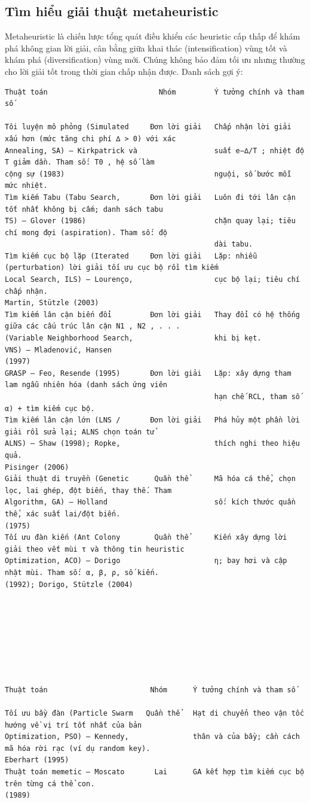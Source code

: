 \documentclass[a4paper,11pt]{article}
\begin{document}
\subsection{Tìm hiểu giải thuật metaheuristic}
Metaheuristic là chiến lược tổng quát điều khiển các heuristic cấp thấp để khám phá không gian lời giải, cân bằng giữa khai thác (intensification) vùng tốt và khám phá (diversification) vùng mới. Chúng không bảo đảm tối ưu nhưng thường cho lời giải tốt trong thời gian chấp nhận được. Danh sách gợi ý:

\begin{Verbatim}[fontsize=\tiny,breaklines=true,breakanywhere=true]
Thuật toán                          Nhóm         Ý tưởng chính và tham số

Tôi luyện mô phỏng (Simulated     Đơn lời giải   Chấp nhận lời giải xấu hơn (mức tăng chi phí ∆ > 0) với xác
Annealing, SA) – Kirkpatrick và                  suất e−∆/T ; nhiệt độ T giảm dần. Tham số: T0 , hệ số làm
cộng sự (1983)                                   nguội, số bước mỗi mức nhiệt.
Tìm kiếm Tabu (Tabu Search,       Đơn lời giải   Luôn đi tới lân cận tốt nhất không bị cấm; danh sách tabu
TS) – Glover (1986)                              chặn quay lại; tiêu chí mong đợi (aspiration). Tham số: độ
                                                 dài tabu.
Tìm kiếm cục bộ lặp (Iterated     Đơn lời giải   Lặp: nhiễu (perturbation) lời giải tối ưu cục bộ rồi tìm kiếm
Local Search, ILS) – Lourenço,                   cục bộ lại; tiêu chí chấp nhận.
Martin, Stützle (2003)
Tìm kiếm lân cận biến đổi         Đơn lời giải   Thay đổi có hệ thống giữa các cấu trúc lân cận N1 , N2 , . . .
(Variable Neighborhood Search,                   khi bị kẹt.
VNS) – Mladenović, Hansen
(1997)
GRASP – Feo, Resende (1995)       Đơn lời giải   Lặp: xây dựng tham lam ngẫu nhiên hóa (danh sách ứng viên
                                                 hạn chế RCL, tham số α) + tìm kiếm cục bộ.
Tìm kiếm lân cận lớn (LNS /       Đơn lời giải   Phá hủy một phần lời giải rồi sửa lại; ALNS chọn toán tử
ALNS) – Shaw (1998); Ropke,                      thích nghi theo hiệu quả.
Pisinger (2006)
Giải thuật di truyền (Genetic      Quần thể      Mã hóa cá thể, chọn lọc, lai ghép, đột biến, thay thế. Tham
Algorithm, GA) – Holland                         số: kích thước quần thể, xác suất lai/đột biến.
(1975)
Tối ưu đàn kiến (Ant Colony        Quần thể      Kiến xây dựng lời giải theo vết mùi τ và thông tin heuristic
Optimization, ACO) – Dorigo                      η; bay hơi và cập nhật mùi. Tham số: α, β, ρ, số kiến.
(1992); Dorigo, Stützle (2004)








Thuật toán                        Nhóm      Ý tưởng chính và tham số

Tối ưu bầy đàn (Particle Swarm   Quần thể   Hạt di chuyển theo vận tốc hướng về vị trí tốt nhất của bản
Optimization, PSO) – Kennedy,               thân và của bầy; cần cách mã hóa rời rạc (ví dụ random key).
Eberhart (1995)
Thuật toán memetic – Moscato       Lai      GA kết hợp tìm kiếm cục bộ trên từng cá thể con.
(1989)



\end{Verbatim}
\end{document}
